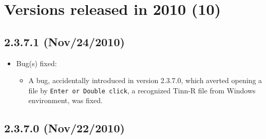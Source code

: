 
\section{Versions released in 2010 (10)}
\subsection*{2.3.7.1 (Nov/24/2010)}

\begin{itemize}
  \item Bug(s) fixed:
    \begin{itemize}
      \item A bug, accidentally introduced in version 2.3.7.0, which averted opening a file by \texttt{Enter or Double click},
        a recognized Tinn-R file from Windows environment, was fixed.
    \end{itemize}
\end{itemize}

\subsection{2.3.7.0 (Nov/22/2010)}

